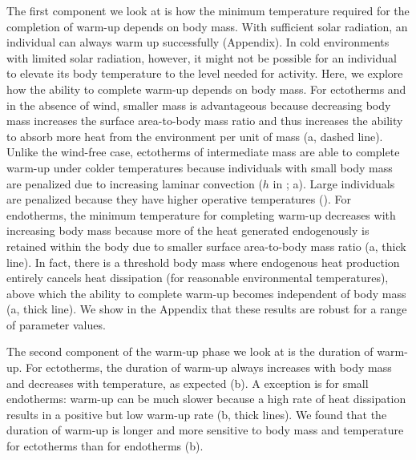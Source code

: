 The first component we look at is how the minimum temperature required for the completion of warm-up depends on body mass.
With sufficient solar radiation, an individual can always warm up successfully (Appendix).
In cold environments with limited solar radiation, however, it might not be possible for an individual to elevate its body temperature to the level needed for activity.
Here, we explore how the ability to complete warm-up depends on body mass.
For ectotherms and in the absence of wind, smaller mass is advantageous because decreasing body mass increases the surface area-to-body mass ratio and thus increases the ability to absorb more heat from the environment per unit of mass (a, dashed line).
Unlike the wind-free case, ectotherms of intermediate mass are able to complete warm-up under colder temperatures because individuals with small body mass are penalized due to increasing laminar convection ($h$ in ; a).
Large individuals are penalized because they have higher operative temperatures (). %
For endotherms, the minimum temperature for completing warm-up decreases with increasing body mass because more of the heat generated endogenously is retained within the body due to smaller surface area-to-body mass ratio (a, thick line).
In fact, there is a threshold body mass where endogenous heat production entirely cancels heat dissipation (for reasonable environmental temperatures), above which the ability to complete warm-up becomes independent of body mass (a, thick line).
We show in the Appendix that these results are robust for a range of parameter values.

The second component of the warm-up phase we look at is the duration of warm-up.
For ectotherms, the duration of warm-up always increases with body mass and decreases with temperature, as expected (b).
A exception is for small endotherms: warm-up can be much slower because a high rate of heat dissipation results in a positive but low warm-up rate (b, thick lines).
We found that the duration of warm-up is longer and more sensitive to body mass and temperature for ectotherms than for endotherms (b).

